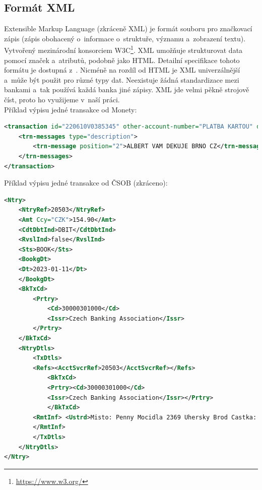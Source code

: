 \subsection*{Formát XML}
Extensible Markup Language (zkráceně XML) je formát souboru pro značkovací zápis (zápis obohacený o~informace o~struktuře, významu a~zobrazení textu). Vytvořený mezinárodní konsorciem W3C\footnote{\url{https://www.w3.org/}}. XML umožňuje strukturovat data pomocí značek a~atributů, podobně jako HTML. Detailní specifikace tohoto formátu je dostupná z~\cite{RFCXML}.
Nicméně na rozdíl od HTML je XML univerzálnější a~může být použit pro různé typy dat. Neexistuje žádná standardizace mezi bankami a~tak používá každá banka jiné zápisy. XML jde velmi pěkně strojově číst, proto ho využijeme v~naší práci.
\\
Příklad výpisu jedné transakce od Monety:
\begin{lstlisting}[language=XML,breaklines=true]
<transaction id="220610V0385345" other-account-number="PLATBA KARTOU" date-post="2022-06-09" date-eff="2022-06-13" var-sym="4152280774" con-sym="1178" spec-sym="" amount="-24.90" contactless="0" mobile-payment="0">
	<trn-messages type="description">
		<trn-message position="2">ALBERT VAM DEKUJE BRNO CZ</trn-message>
	</trn-messages>
</transaction>
\end{lstlisting}
Příklad výpisu jedné transakce od ČSOB (zkráceno):
\begin{lstlisting}[language=XML,breaklines=true]
<Ntry>
    <NtryRef>20503</NtryRef>
    <Amt Ccy="CZK">154.90</Amt>
    <CdtDbtInd>DBIT</CdtDbtInd>
    <RvslInd>false</RvslInd>
    <Sts>BOOK</Sts>
    <BookgDt>
	<Dt>2023-01-11</Dt>
	</BookgDt>
	<BkTxCd>
		<Prtry>
			<Cd>30000301000</Cd>
			<Issr>Czech Banking Association</Issr>
		</Prtry>
	</BkTxCd>
	<NtryDtls>
		<TxDtls>
		<Refs><AcctSvcrRef>20503</AcctSvcrRef></Refs>
			<BkTxCd>
			<Prtry><Cd>30000301000</Cd>
			<Issr>Czech Banking Association</Issr></Prtry>
			</BkTxCd>
		<RmtInf> <Ustrd>Misto: Penny Mocidla 2369 Uhersky Brod Castka: 154.9 CZK 09.01.2023</Ustrd>
		</RmtInf>
		</TxDtls>
    </NtryDtls>
</Ntry>
\end{lstlisting}



